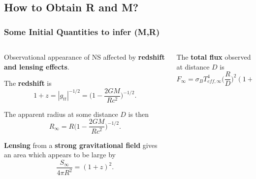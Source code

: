 

\subsection*{How to Obtain R and M?}
\begin{frame}
\frametitle{Some Initial Quantities to infer (M,R)}

\begin{columns}[c]
\begin{column}{0.6\textwidth} 

\begin{enumerate}\scriptsize{
\item Observational appearance of NS affected by {\bf redshift and lensing effects}.

\quad



\item The {\bf redshift} is
$$1+z = |g_{tt}|^{-1/2} = \Big(1 - \frac{2GM}{Rc^2} \Big)^{-1/2}.$$



\item The apparent radius at some distance $D$ is then
$$R_{\infty} = R \Big( 1 - \frac{2GM}{Rc^2}\Big)^{-1/2}.$$




\item {\bf Lensing} from a {\bf strong gravitational field} gives an area which  appears to be large by 
$$\frac{S_{\infty}}{4\pi R^2} = (1+z)^2.$$


}
\seti
\end{enumerate}
\end{column}
\begin{column}{0.6\textwidth} 
\begin{enumerate}\scriptsize{
\conti



\item The {\bf  total flux } observed at distance $D$ is 
$$F_{\infty} = \sigma_B T^4_{eff,\infty} \Big ( \frac{R}{D} \Big)^2 (1+z)^2.$$


}
\end{enumerate}
\end{column}
\end{columns}
\end{frame}
